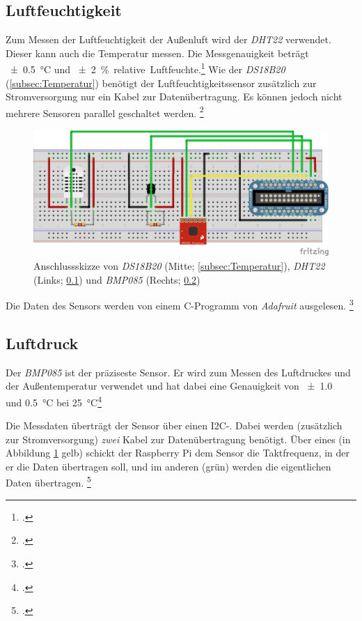 \subsection{Luftfeuchtigkeit}
\label{subsec:Luftfeuchtigkeit}

Zum Messen der Luftfeuchtigkeit der Außenluft wird der \emph{DHT22} verwendet. Dieser kann auch die Temperatur messen. Die Messgenauigkeit beträgt \SI{\pm 0.5}{\degreeCelsius} und \SI{\pm 2}{\% .relative.Luftfeuchte}.\footcite{DHT22}
Wie der \emph{DS18B20} (\ref{subsec:Temperatur}) benötigt der Luftfeuchtigkeitssensor zusätzlich zur Stromversorgung nur ein Kabel zur Datenübertragung. Es können jedoch nicht mehrere Sensoren parallel geschaltet werden. \footcite[Wiring]{DHT}

\begin{figure}
  \centering
     \includegraphics[width=\textwidth]{figures/steckbrett.png}
  \caption{Anschlussskizze von \emph{DS18B20} (Mitte; \ref{subsec:Temperatur}), \emph{DHT22} (Links; \ref{subsec:Luftfeuchtigkeit}) und \emph{BMP085} (Rechts; \ref{subsec:Luftdruck})}
  \label{fig:steckbrett}
\end{figure}

Die Daten des Sensors werden von einem \gls{C}-Programm von \emph{Adafruit} ausgelesen.
\footcite[Software Install]{DHT}

\subsection{Luftdruck}
\label{subsec:Luftdruck}

Der \emph{BMP085} ist der präziseste Sensor. Er wird zum Messen des Luftdruckes und der Außentemperatur verwendet und hat dabei eine Genauigkeit von \SI{\pm 1.0}{\hecto{}} und \SI{0.5}{\degreeCelsius} bei \SI{25}{\degreeCelsius}\footcite[6]{BMP085}

Die Messdaten überträgt der Sensor über einen \gls{I2C}-. Dabei werden (zusätzlich zur Stromversorgung) \emph{zwei} Kabel zur Datenübertragung benötigt.
Über eines (in Abbildung \ref{fig:steckbrett} gelb) schickt der Raspberry Pi dem Sensor die Taktfrequenz, in der er die Daten übertragen soll, und im anderen (grün) werden die eigentlichen Daten übertragen.
\footcite[Hooking Everything Up]{bmp058_adafruit}

